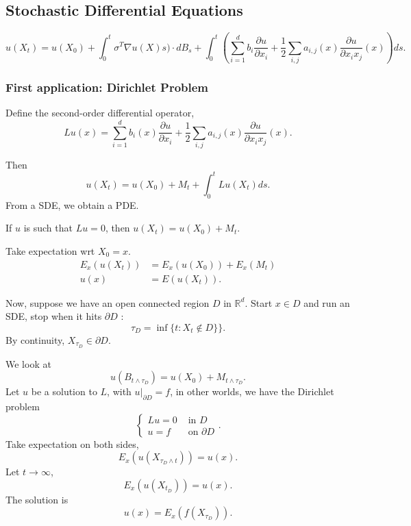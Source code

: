 
\subsection{Stochastic Differential Equations}


\[
	u(X_t) = 
	u(X_0) + \int _0^t \sigma^T \nabla u(X)s) \cdot  d B_s + \int _0^t \left(\sum_{i=1}^{d} b_i \frac{\partial u}{\partial x_i} + \frac{1}{2} \sum_{i , j} a_{i,j}(x) \frac{\partial u}{\partial x_i x_j} (x) \right)  ds
.\] 

\subsubsection{First application: Dirichlet Problem}




Define the second-order differential operator,
\[
	L u(x) = \sum_{i=1}^{d} b_i(x) \frac{\partial u}{\partial x_i} + \frac{1}{2} \sum_{i , j} a_{i,j}(x) \frac{\partial u}{\partial x_i x_j} (x)
.\] 

Then
\[
	u(X_t) = u(X_0) + M_t + \int _0^t L u(X_t) ds
.\] 
From a SDE, we obtain a PDE.

If $u$ is such that $L u = 0$, then $u(X_t) = u(X_0) + M_t$.

Take expectation wrt $X_0 = x$. 
\begin{align*}
	E_x\left( u(X_t) \right) 
	&= E_x\left( u(X_0) \right) + E_x(M_t) \\
	u(x) &= E(u(X_t)) 
.\end{align*}


Now, suppose we have an open connected region $D$ in $\mathbb{R}^d$. Start $x \in D$ and run an SDE, stop when it hits $\partial D$ :
\[
	\tau_D = \inf \{t: X_t \not\in D\}\} 
.\] 
By continuity, $X_{\tau_D} \in \partial D$.

We look at
\[
	u(B_{t \wedge \tau_D}) = u(X_0) + M_{t \wedge \tau_D}
.\] 
Let $u$ be a solution to $L$, with  $u|_{\partial D} = f$, in other worlds, we have the Dirichlet problem
\[
	\begin{cases}
		L u = 0 & \text{ in }D \\
		u = f & \text{ on }\partial D
	\end{cases}
.\] 
Take expectation on both sides,
\[
	E_x(u(X_{\tau_D \wedge t})) = u(x)
.\] 
Let $t \to  \infty $, 
\[
	E_x(u(X_{t_D})) = u(x)
.\] 
The solution is
\[
	u(x) = E_x\left( f(X_{\tau_D}) \right) 
.\] 


